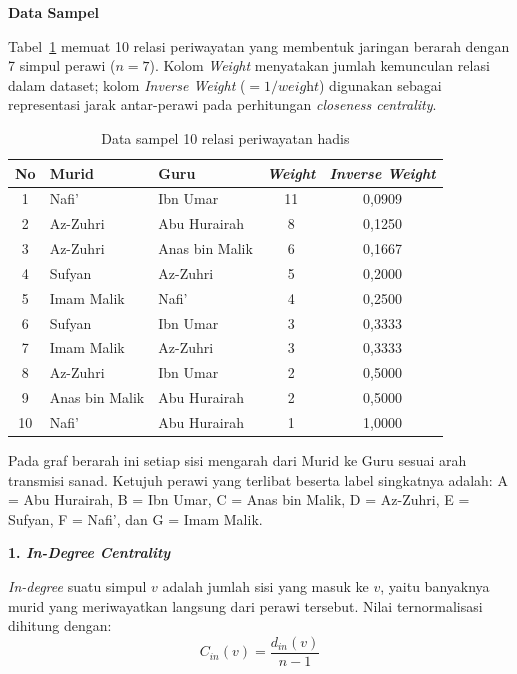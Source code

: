 \vspace{0.3cm}
\noindent\textbf{Data Sampel}

\vspace{0.2cm}
\noindent Tabel~\ref{lamp:tab:sampel} memuat 10 relasi periwayatan yang membentuk jaringan berarah dengan 7 simpul perawi ($n = 7$). Kolom \textit{Weight} menyatakan jumlah kemunculan relasi dalam dataset; kolom \textit{Inverse Weight} ($= 1 / \textit{weight}$) digunakan sebagai representasi jarak antar-perawi pada perhitungan \textit{closeness centrality}.

\begin{table}[H]
\centering
\caption{Data sampel 10 relasi periwayatan hadis}
\label{lamp:tab:sampel}
\begin{tabular}{|c|l|l|c|c|}
\hline
\textbf{No} & \textbf{Murid} & \textbf{Guru} & \textbf{\textit{Weight}} & \textbf{\textit{Inverse Weight}} \\
\hline
1  & Nafi'            & Ibn Umar         & 11 & 0,0909 \\
2  & Az-Zuhri         & Abu Hurairah     & 8  & 0,1250 \\
3  & Az-Zuhri         & Anas bin Malik   & 6  & 0,1667 \\
4  & Sufyan           & Az-Zuhri         & 5  & 0,2000 \\
5  & Imam Malik       & Nafi'            & 4  & 0,2500 \\
6  & Sufyan           & Ibn Umar         & 3  & 0,3333 \\
7  & Imam Malik       & Az-Zuhri         & 3  & 0,3333 \\
8  & Az-Zuhri         & Ibn Umar         & 2  & 0,5000 \\
9  & Anas bin Malik   & Abu Hurairah     & 2  & 0,5000 \\
10 & Nafi'            & Abu Hurairah     & 1  & 1,0000 \\
\hline
\end{tabular}
\end{table}

\noindent Pada graf berarah ini setiap sisi mengarah dari Murid ke Guru sesuai arah transmisi sanad. Ketujuh perawi yang terlibat beserta label singkatnya adalah: A = Abu Hurairah, B = Ibn Umar, C = Anas bin Malik, D = Az-Zuhri, E = Sufyan, F = Nafi', dan G = Imam Malik.

\vspace{0.4cm}
\noindent\textbf{1. \textit{In-Degree Centrality}}

\vspace{0.2cm}
\noindent \textit{In-degree} suatu simpul $v$ adalah jumlah sisi yang masuk ke $v$, yaitu banyaknya murid yang meriwayatkan langsung dari perawi tersebut. Nilai ternormalisasi dihitung dengan:
$$C_{in}(v) = \frac{d_{in}(v)}{n - 1}$$

